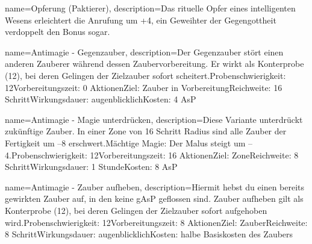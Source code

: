 {
    name={Opferung (Paktierer)},
    description={Das rituelle Opfer eines intelligenten Wesens erleichtert die Anrufung um +4, ein Geweihter der Gegengottheit verdoppelt den Bonus sogar.}
}


{
    name={Antimagie - Gegenzauber},
    description={Der Gegenzauber stört einen anderen Zauberer während dessen Zaubervorbereitung. Er wirkt als Konterprobe (12), bei deren Gelingen der Zielzauber sofort scheitert.\newline Probenschwierigkeit: 12\newline Vorbereitungszeit: 0 Aktionen\newline Ziel: Zauber in Vorbereitung\newline Reichweite: 16 Schritt\newline Wirkungsdauer: augenblicklich\newline Kosten: 4 AsP}
}


{
    name={Antimagie - Magie unterdrücken},
    description={Diese Variante unterdrückt zukünftige Zauber. In einer Zone von 16 Schritt Radius sind alle Zauber der Fertigkeit um –8 erschwert.\newline Mächtige Magie: Der Malus steigt um –4.\newline Probenschwierigkeit: 12\newline Vorbereitungszeit: 16 Aktionen\newline Ziel: Zone\newline Reichweite: 8 Schritt\newline Wirkungsdauer: 1 Stunde\newline Kosten: 8 AsP}
}


{
    name={Antimagie - Zauber aufheben},
    description={Hiermit hebst du einen bereits gewirkten Zauber auf, in den keine gAsP geflossen sind. Zauber aufheben gilt als Konterprobe (12), bei deren Gelingen der Zielzauber sofort aufgehoben wird.\newline Probenschwierigkeit: 12\newline Vorbereitungszeit: 8 Aktionen\newline Ziel: Zauber\newline Reichweite: 8 Schritt\newline Wirkungsdauer: augenblicklich\newline Kosten: halbe Basiskosten des Zaubers}
}


